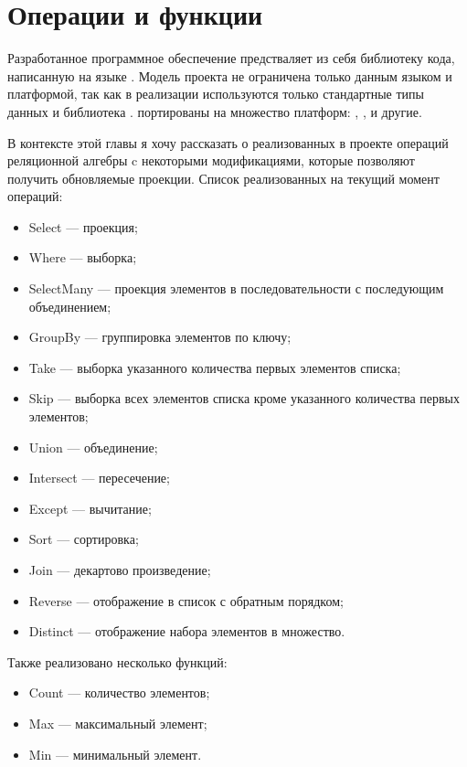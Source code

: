 \chapter{Операции и функции}
\label{sec:development}

Разработанное программное обеспечение предстваляет из себя библиотеку кода,
написанную на языке \csharp{}. Модель проекта не ограничена только данным языком и платформой,
так как в реализации используются только стандартные типы данных и библиотека \rx{}.
\rx{} портированы на множество платформ: \java{}, \javascript{}, \python{} и другие.

В контексте этой главы я хочу рассказать о реализованных в проекте операций реляционной алгебры c некоторыми модификациями,
которые позволяют получить обновляемые проекции. Список реализованных на текущий момент операций:

\begin{itemize}
  \item Select --- проекция;
  \item Where --- выборка;
  \item SelectMany --- проекция элементов в последовательности с последующим объединением;
  \item GroupBy --- группировка элементов по ключу;
  \item Take --- выборка указанного количества первых элементов списка;
  \item Skip --- выборка всех элементов списка кроме указанного количества первых элементов;
  \item Union --- объединение;
  \item Intersect --- пересечение;
  \item Except --- вычитание;
  \item Sort --- сортировка;
  \item Join --- декартово произведение;
  \item Reverse --- отображение в список с обратным порядком;
  \item Distinct --- отображение набора элементов в множество.
\end{itemize}

Также реализовано несколько функций:

\begin{itemize}
  \item Count --- количество элементов;
  \item Max --- максимальный элемент;
  \item Min --- минимальный элемент.
\end{itemize}

